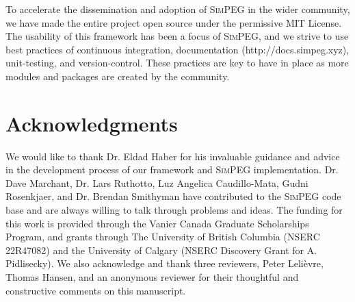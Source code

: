 \documentclass[preprint,review,3p,times,onecolumn,authoryear]{elsarticle}
\newcommand{\SimPEG}{\textsc{SimPEG}\xspace}
\begin{document}
To accelerate the dissemination and adoption of \SimPEG in the wider community, we have made the entire project open source under the permissive MIT License. The usability of this framework has been a focus of \SimPEG, and we strive to use best practices of continuous integration, documentation (http://docs.simpeg.xyz), unit-testing, and version-control. These practices are key to have in place as more modules and packages are created by the community.

{%
\section*{Acknowledgments}
We would like to thank Dr. Eldad Haber for his invaluable guidance and advice in the development process of our framework and \SimPEG implementation.
Dr. Dave Marchant, Dr. Lars Ruthotto, Luz Angelica Caudillo-Mata, Gudni Rosenkjaer, and Dr. Brendan Smithyman
have contributed to the \SimPEG code base and are always willing to talk through problems and ideas.
The funding for this work is provided through the Vanier Canada Graduate Scholarships Program, and grants through
The University of British Columbia (NSERC 22R47082) and
the University of Calgary (NSERC Discovery Grant for A. Pidlisecky).
We also acknowledge and thank three reviewers, Peter Leli\`{e}vre, Thomas Hansen, and an anonymous reviewer for their thoughtful and constructive comments on this manuscript.

\newpage



}
\end{document}
